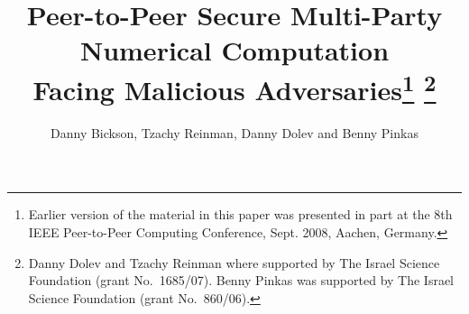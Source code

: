 \documentclass[10pt]{svjour3}
\begin{document}
\title{Peer-to-Peer Secure Multi-Party Numerical Computation\\
Facing Malicious Adversaries\thanks{Earlier version of the
material in this paper was presented in part at the
        8th IEEE Peer-to-Peer Computing Conference, Sept. 2008, Aachen, Germany.}
        \thanks{Danny Dolev and Tzachy Reinman where supported by The Israel Science Foundation
  (grant No.~1685/07). Benny Pinkas was supported by The Israel Science Foundation
  (grant No.~860/06).}}
\author{Danny Bickson, Tzachy Reinman, Danny Dolev and Benny Pinkas}

\maketitle
\thispagestyle{empty}
\end{document}
